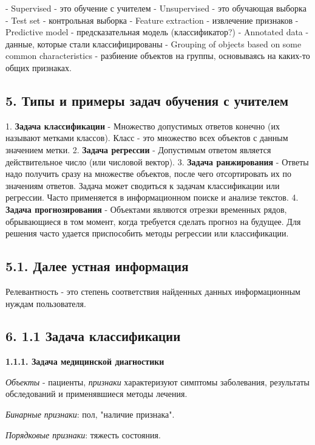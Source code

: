 - Supervised - это обучение с учителем
- Unsupervised - это обучающая выборка
- Test set - контрольная выборка
- Feature extraction - извлечение признаков
- Predictive model - предсказательная модель (классификатор?)
- Annotated data - данные, которые стали классифицированы
- Grouping of objects based on some common characteristics - разбиение
объектов на группы, основываясь на каких-то общих признаках.

\subsection{5. Типы и примеры задач обучения с учителем}

1. \textbf{Задача классификации}
    - Множество допустимых ответов конечно (их называют метками классов).
    Класс - это множество всех объектов с данным значением метки.
2. \textbf{Задача регрессии}
    - Допустимым ответом является действительное число
    (или числовой вектор).
3. \textbf{Задача ранжирования}
    - Ответы надо получить сразу на множестве объектов, после чего
    отсортировать их по значениям ответов.
    Задача может сводиться к задачам классификации или регрессии.
    Часто применяется в информационном поиске и анализе текстов.
4. \textbf{Задача прогнозирования}
    - Объектами являются отрезки временных рядов, обрывающиеся в том момент,
    когда требуется сделать прогноз на будущее.
    Для решения часто удается приспособить методы регрессии или
    классификации.

\subsection{5.1. Далее устная информация}

Релевантность - это степень соответствия найденных данных информационным
нуждам пользователя.

\subsection{6. 1.1 Задача классификации}

\textbf{1.1.1. Задача медицинской диагностики}

\textit{Объекты} - пациенты, \textit{признаки} характеризуют симптомы заболевания,
результаты обследований и применявшиеся методы лечения.

\textit{Бинарные признаки}: пол, "наличие признака".

\textit{Порядковые признаки}: тяжесть состояния.

